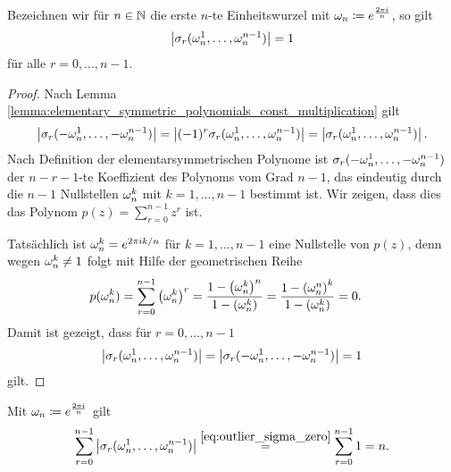 \begin{lemma}
    \label{lemma:outlier_sigma_zero}
    Bezeichnen wir für $n \in \mathbb{N}$ die erste $n$-te Einheitswurzel mit
    $\omega_n \coloneqq e^{\frac{2 \pi i}{n}}$, so gilt
    \begin{equation}
        \label{eq:outlier_sigma_zero}
        \left\lvert \sigma_r(\omega_n^1, \dots, \omega_n^{n-1}) \right\rvert = 1
    \end{equation}
    für alle $r = 0, \dots, n-1$.
\end{lemma}
\begin{proof}
    Nach Lemma \ref{lemma:elementary_symmetric_polynomials_const_multiplication}
    gilt
    \[
        \left\lvert \sigma_r(-\omega_n^1, \dots, -\omega_n^{n-1}) \right\rvert
        = \left\lvert (-1)^r \sigma_r(\omega_n^1, \dots, \omega_n^{n-1}) \right\rvert
        = \left\lvert \sigma_r(\omega_n^1, \dots, \omega_n^{n-1}) \right\rvert.
    \]
    Nach Definition der elementarsymmetrischen Polynome ist
    $\sigma_r({-\omega_n^1, \dots, -\omega_n^{n-1}})$
    der $n\!-\!r\!-\!1\text{-te}$ Koeffizient des Polynoms vom
    Grad $n-1$, das eindeutig durch die $n-1$ Nullstellen
    $\omega_n^k$ mit $k=1, \dots, n-1$ bestimmt ist.
    Wir zeigen, dass dies das Polynom $p(z) = \sum_{r=0}^{n-1} z^r$ ist.

    \noindent Tatsächlich ist $\omega_n^k = e^{2 \pi i k / n}$ für $k = 1, \dots, n-1$
    eine Nullstelle von $p(z)$, denn wegen $\omega_n^k \neq 1$ folgt mit Hilfe der
    geometrischen Reihe
    \[
        \begin{split}
            p(\omega_n^k)
            &= \sum_{r=0}^{n-1} \left( \omega_n^k \right)^r
            = \frac{1 - \left( \omega_n^k \right)^n}{1 - \left( \omega_n^k \right)}
            = \frac{1 - \left( \omega_n^n \right)^k}{1 - \left( \omega_n^k \right)}
            = 0.
        \end{split}
    \]
    Damit ist gezeigt, dass für $r=0, \dots, n-1$
    \[
        \left\lvert \sigma_r(\omega_n^1, \dots, \omega_n^{n-1}) \right\rvert
        = \left\lvert \sigma_r(-\omega_n^1, \dots, -\omega_n^{n-1}) \right\rvert
        = 1
    \]
    gilt.
\end{proof}

\begin{corollary}
    \label{corollary:outlier_sigma_zero_row_sum}
    Mit $\omega_n \coloneqq e^{\frac{2 \pi i}{n}}$ gilt
    \begin{equation}
        \label{eq:outlier_sigma_zero_row_sum}
        \sum_{r=0}^{n-1} \left\lvert \sigma_r(\omega_n^1, \dots, \omega_n^{n-1}) \right\rvert
        \overset{\eqref{eq:outlier_sigma_zero}}= \sum_{r=0}^{n-1} 1
        = n.
    \end{equation}
\end{corollary}

